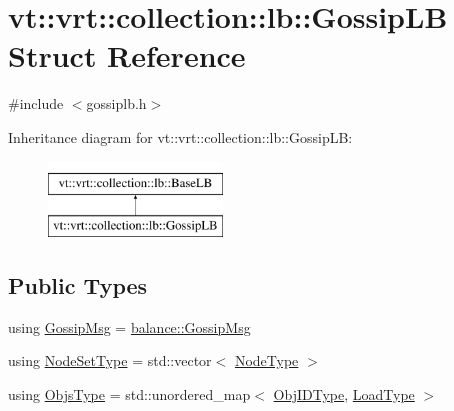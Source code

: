 \hypertarget{structvt_1_1vrt_1_1collection_1_1lb_1_1_gossip_l_b}{}\section{vt\+:\+:vrt\+:\+:collection\+:\+:lb\+:\+:Gossip\+LB Struct Reference}
\label{structvt_1_1vrt_1_1collection_1_1lb_1_1_gossip_l_b}


{\ttfamily \#include $<$gossiplb.\+h$>$}

Inheritance diagram for vt\+:\+:vrt\+:\+:collection\+:\+:lb\+:\+:Gossip\+LB\+:\begin{figure}[H]
\begin{center}
\leavevmode
\includegraphics[height=2.000000cm]{structvt_1_1vrt_1_1collection_1_1lb_1_1_gossip_l_b}
\end{center}
\end{figure}
\subsection*{Public Types}
\begin{DoxyCompactItemize}
\item 
using \hyperlink{structvt_1_1vrt_1_1collection_1_1lb_1_1_gossip_l_b_af7170ae946da8af68105109f04824f03}{Gossip\+Msg} = \hyperlink{structvt_1_1vrt_1_1collection_1_1balance_1_1_gossip_msg}{balance\+::\+Gossip\+Msg}
\item 
using \hyperlink{structvt_1_1vrt_1_1collection_1_1lb_1_1_gossip_l_b_abb53f1d4bd3c37f3e68c3b5b0e1f1c86}{Node\+Set\+Type} = std\+::vector$<$ \hyperlink{namespacevt_a866da9d0efc19c0a1ce79e9e492f47e2}{Node\+Type} $>$
\item 
using \hyperlink{structvt_1_1vrt_1_1collection_1_1lb_1_1_gossip_l_b_ad2093cf08cc6af0f3deb4441e40c55a9}{Objs\+Type} = std\+::unordered\+\_\+map$<$ \hyperlink{structvt_1_1vrt_1_1collection_1_1lb_1_1_base_l_b_a15a2f756b59c8c2437985206b32aa403}{Obj\+I\+D\+Type}, \hyperlink{structvt_1_1vrt_1_1collection_1_1lb_1_1_base_l_b_a215e22b9f12678303f49615ae3be05cc}{Load\+Type} $>$
\end{DoxyCompactItemize}
